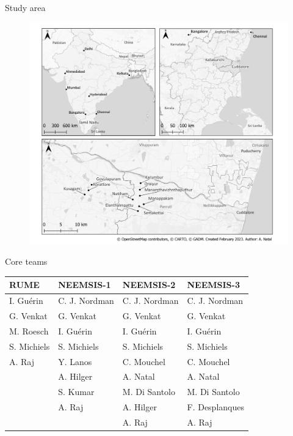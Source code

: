 \documentclass[aspectratio=169]{beamer}
\begin{document}
\begin{frame}{Study area}

\begin{figure}[h]
\centering
\includegraphics[width=0.5\columnwidth]{INPUT/RUME-NEEMSIS.png}
\end{figure}

\end{frame}



\begin{frame}{Core teams}
\begin{scriptsize}

\begin{table}[h]
  \centering
    \begin{tabular}{llll}
    \toprule
    RUME  & NEEMSIS-1 & NEEMSIS-2 & NEEMSIS-3 \\
    \midrule
    I. Guérin & C. J. Nordman & C. J. Nordman & C. J. Nordman \\
    G. Venkat & G. Venkat & G. Venkat & G. Venkat \\
    M. Roesch & I. Guérin & I. Guérin & I. Guérin \\
    S. Michiels & S. Michiels & S. Michiels & S. Michiels \\
    A. Raj & Y. Lanos & C. Mouchel & C. Mouchel \\
          & A. Hilger & A. Natal & A. Natal \\
          & S. Kumar & M. Di Santolo & M. Di Santolo \\
          & A. Raj & A. Hilger & F. Desplanques \\
          &       & A. Raj & A. Raj \\
    \bottomrule
    \end{tabular}%
\end{table}%

\end{scriptsize}
\end{frame}
\end{document}
